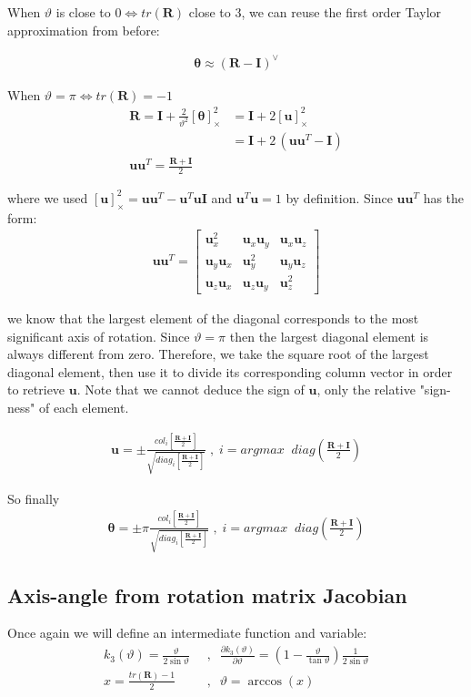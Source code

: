 \documentclass{article}
\renewcommand\aa{\bm{\theta}}
\renewcommand\t{\vartheta}
\newcommand\R{\bm{R}}
\newcommand\I{\bm{I}}
\renewcommand\u{\bm{u}}
\renewcommand\skew[1]{[#1]_{\times}}
\begin{document}
When $\t$ is close to $0 \iff tr(\R)$ close to $3$, we can reuse the first
order Taylor approximation from before:

\begin{align}
  \aa \approx \left( \R - \I \right)^\vee
\end{align}

When $\t = \pi \iff tr(\R) = -1$
\begin{align}
  \R = \I + \frac{2}{\t^2} \skew{\aa}^2 
  &= \I + 2\skew{\u}^2 \\
  &= \I + 2\, (\u \u^T - \I) \\
  \u \u^T = \frac{\R + \I }{2}
\end{align}

where we used $\skew{\u}^2 =  \u \u^T - \u^T \u \I$ and $\u^T \u = 1$ by definition.
Since $\u \u^T$ has the form:
\begin{align}
  \u \u^T = 
  \begin{bmatrix}
    \u_x^2 & \u_x \u_y & \u_x \u_z \\
    \u_y \u_x & \u_y^2 & \u_y \u_z \\
    \u_z \u_x & \u_z \u_y & \u_z^2
  \end{bmatrix}
\end{align}

we know that the largest element of the diagonal corresponds to the most
significant axis of rotation. Since $\t=\pi$ then the largest diagonal element
is always different from zero. Therefore, we take the square root of the largest
diagonal element, then use it to divide its corresponding column vector in
order to retrieve $\u$. Note that we cannot deduce the sign of $\u$, only the
relative "sign-ness" of each element.

\begin{align}
  \u = \pm 
    \frac{col_i \left[ \frac{\R + \I}{2} \right] }
         {\sqrt{diag_i \left[ \frac{\R + \I }{2} \right] }}
  \;,\; i = argmax \;\; diag \left( \frac{\R + \I }{2} \right)
\end{align}

So finally
\begin{align}
  \aa = \pm \pi
    \frac{col_i \left[ \frac{\R + \I}{2} \right] }
         {\sqrt{diag_i \left[ \frac{\R + \I }{2} \right] }}
  \;,\; i = argmax \;\; diag \left( \frac{\R + \I }{2} \right)
\end{align}

\subsection{Axis-angle from rotation matrix Jacobian}
Once again we will define an intermediate function and variable:
\begin{align}
  k_3(\t) = \frac{\t}{2\sin{\t}} \;\;&,\;\;
  \frac{\partial k_3(\t)}{\partial \t} = 
    \left(1 - \frac{\t}{\tan{\t}} \right) \frac{1}{2\sin{\t}} \\
  x = \frac{tr(\R) - 1}{2} \;\;&,\;\; \t = \arccos(x)
\end{align}
\end{document}

